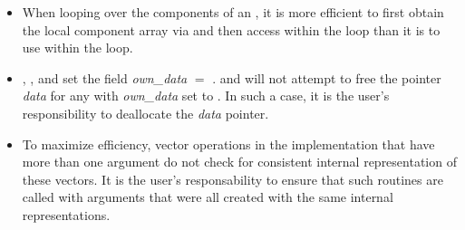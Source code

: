 \begin{itemize}
                                        
\item
  When looping over the components of an  , it is     
  more efficient to first obtain the local component array via       
   and then access  within the     
  loop than it is to use  within the loop.        
                                                               
\item
  {\warn} , , 
  and  set the field 
  {\em own\_data} $=$ . 
   and 
  will not attempt to free the pointer {\em data} for any  with
  {\em own\_data} set to . In such a case, it is the user's responsibility to
  deallocate the {\em data} pointer.

\item
  {\warn} To maximize efficiency, vector operations in the {\nvecp} implementation
  that have more than one  argument do not check for
  consistent internal representation of these vectors. It is the user's 
  responsability to ensure that such routines are called with 
  arguments that were all created with the same internal representations.

\end{itemize}

